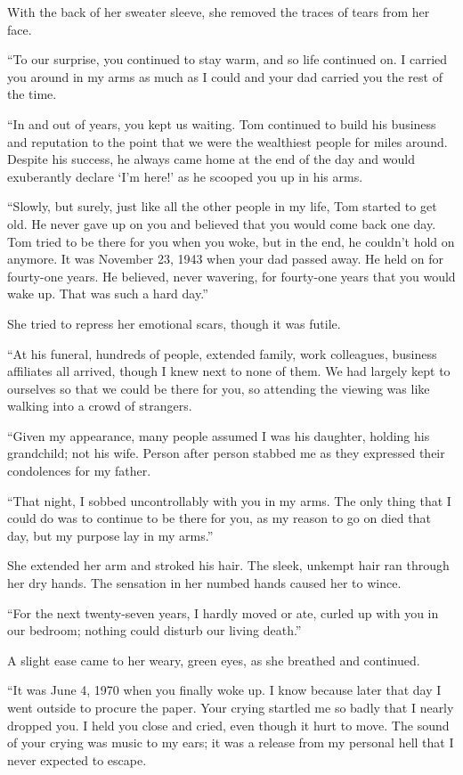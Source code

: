 With the back of her sweater sleeve, she removed the traces of tears from her face.

``To our surprise, you continued to stay warm, and so life continued on. I carried you around in my arms as much as I could and your dad carried you the rest of the time.

``In and out of years, you kept us waiting. Tom continued to build his business and reputation to the point that we were the wealthiest people for miles around. Despite his success, he always came home at the end of the day and would exuberantly declare `I'm here!' as he scooped you up in his arms.

``Slowly, but surely, just like all the other people in my life, Tom started to get old. He never gave up on you and believed that you would come back one day. Tom tried to be there for you when you woke, but in the end, he couldn't hold on anymore. It was November 23, 1943 when your dad passed away. He held on for fourty-one years. He believed, never wavering, for fourty-one years that you would wake up. That was such a hard day.''

She tried to repress her emotional scars, though it was futile.

``At his funeral, hundreds of people, extended family, work colleagues, business affiliates all arrived, though I knew next to none of them. We had largely kept to ourselves so that we could be there for you, so attending the viewing was like walking into a crowd of strangers.

``Given my appearance, many people assumed I was his daughter, holding his grandchild; not his wife. Person after person stabbed me as they expressed their condolences for my father.

``That night, I sobbed uncontrollably with you in my arms. The only thing that I could do was to continue to be there for you, as my reason to go on died that day, but my purpose lay in my arms.''

She extended her arm and stroked his hair. The sleek, unkempt hair ran through her dry hands. The sensation in her numbed hands caused her to wince.

``For the next twenty-seven years, I hardly moved or ate, curled up with you in our bedroom; nothing could disturb our living death.''

A slight ease came to her weary, green eyes, as she breathed and continued.

``It was June 4, 1970 when you finally woke up. I know because later that day I went outside to procure the paper. Your crying startled me so badly that I nearly dropped you. I held you close and cried, even though it hurt to move. The sound of your crying was music to my ears; it was a release from my personal hell that I never expected to escape.

